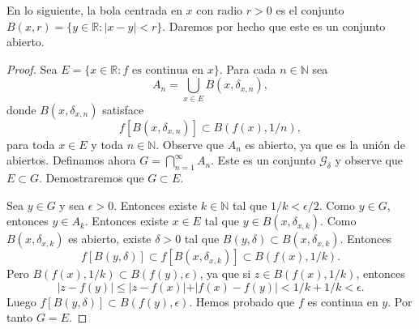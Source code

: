 \documentclass[12pt]{article}
\newcommand{\N}{\mathbb{N}}
\newcommand{\R}{\mathbb{R}}
\begin{document}
En lo siguiente, la bola centrada en $x$ con radio $r > 0$ es el conjunto $B(x, r) = \{y \in \R: \lvert x - y \lvert < r \}$. Daremos por hecho que este es un conjunto abierto.
\begin{proof}
Sea $E = \{x \in \R : f \text{ es continua en } x \}$. Para cada $n \in \N$ sea 
$$A_n = \bigcup_{x\in E} B(x, \delta_{x, n}), $$
donde $B(x, \delta_{x, n})$ satisface  
$$ f[B(x, \delta_{x, n})] \subset B(f(x), 1/n), $$
para toda $x \in E$ y toda $n \in \N.$ Observe que $A_n$ es abierto, ya que es la unión de abiertos. Definamos ahora $G = \bigcap_{n=1}^{\infty} A_n$. Este es un conjunto $\mathcal{G}_\delta$ y observe que $E \subset G$. Demostraremos que $G \subset E$.

Sea $y \in G$ y sea $\epsilon > 0.$ Entonces existe $k \in \N$ tal que $1/k < \epsilon/ 2 $. Como $y \in G$, entonces $y \in A_k$. Entonces existe $x \in E$ tal que $y \in B(x, \delta_{x, k})$. Como $B(x, \delta_{x, k})$ es abierto, existe $\delta > 0 $ tal que $B(y, \delta) \subset B(x, \delta_{x, k})$. Entonces 
$$f[B(y, \delta)] \subset f[B(x, \delta_{x, k})] \subset B(f(x), 1/k). $$
Pero $ B(f(x), 1/k) \subset B(f(y), \epsilon)$, ya que si $z \in B(f(x), 1/k)$, entonces $$\lvert z - f(y) \lvert \leq \lvert z - f(x) \lvert + \lvert f(x) - f(y) \lvert < 1/k + 1/k < \epsilon.$$
Luego $f[B(y, \delta)] \subset B(f(y), \epsilon)$. Hemos probado que $f$ es continua en $y$. Por tanto $G = E$.
\end{proof}
\end{document}
